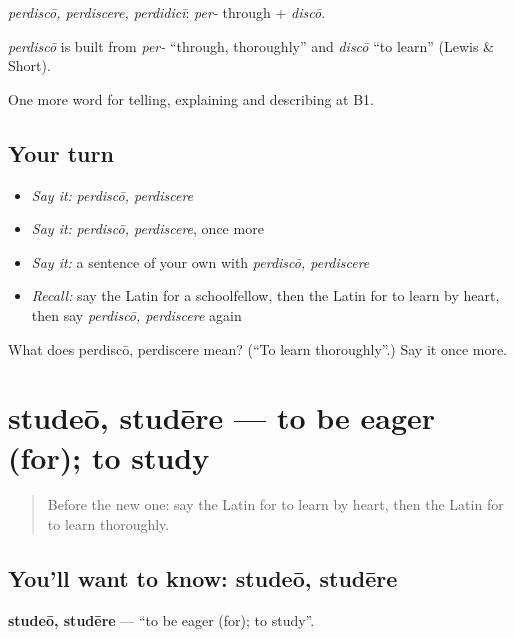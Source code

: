 \emph{perdiscō, perdiscere, perdidicī}: \emph{per-} through + \emph{discō}.

\begin{cousinweb}
\emph{perdiscō} is built from \emph{per-} \textquotedblleft{}through, thoroughly\textquotedblright{} and \emph{discō} \textquotedblleft{}to learn\textquotedblright{} (Lewis \& Short).
\end{cousinweb}

\begin{grammarlens}[title={What you've built}]
One more word for telling, explaining and describing at B1.
\end{grammarlens}

\subsection*{Your turn}
\begin{itemize}
\raggedright
  \item \emph{Say it:} \emph{perdiscō, perdiscere}
  \item \emph{Say it:} \emph{perdiscō, perdiscere}, once more
  \item \emph{Say it:} a sentence of your own with \emph{perdiscō, perdiscere}
  \item \emph{Recall:} say the Latin for a schoolfellow, then the Latin for to learn by heart, then say \emph{perdiscō, perdiscere} again
\end{itemize}

\begin{tcolorbox}[breakable,colback=teal!4,colframe=teal!35!black,title={Before you move on}]
What does perdiscō, perdiscere mean? (\textquotedblleft{}To learn thoroughly\textquotedblright{}.) Say it once more.
\end{tcolorbox}
\section[studeō, studēre]{studeō, studēre — to be eager (for); to study}

\label{lesson:LA-C402-studeo}



\begin{quote}
Before the new one: say the Latin for to learn by heart, then the Latin for to learn thoroughly.
\end{quote}

\subsection*{You'll want to know: studeō, studēre}
\textbf{studeō, studēre} — \textquotedblleft{}to be eager (for); to study\textquotedblright{}.

